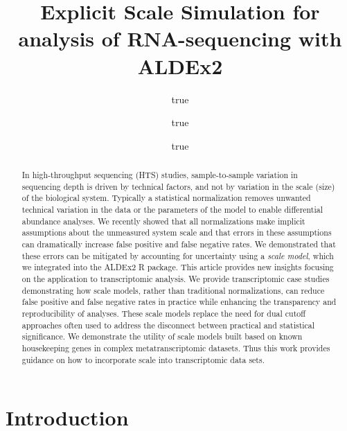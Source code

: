 \documentclass[
]{article}
\title{Explicit Scale Simulation for analysis of RNA-sequencing with
ALDEx2}
\author{true \and true \and true}
\date{}
\begin{document}
\maketitle
\begin{abstract}
In high-throughput sequencing (HTS) studies, sample-to-sample variation
in sequencing depth is driven by technical factors, and not by variation
in the scale (size) of the biological system. Typically a statistical
normalization removes unwanted technical variation in the data or the
parameters of the model to enable differential abundance analyses. We
recently showed that all normalizations make implicit assumptions about
the unmeasured system scale and that errors in these assumptions can
dramatically increase false positive and false negative rates. We
demonstrated that these errors can be mitigated by accounting for
uncertainty using a \emph{scale model}, which we integrated into the
ALDEx2 R package. This article provides new insights focusing on the
application to transcriptomic analysis. We provide transcriptomic case
studies demonstrating how scale models, rather than traditional
normalizations, can reduce false positive and false negative rates in
practice while enhancing the transparency and reproducibility of
analyses. These scale models replace the need for dual cutoff approaches
often used to address the disconnect between practical and statistical
significance. We demonstrate the utility of scale models built based on
known housekeeping genes in complex metatranscriptomic datasets. Thus
this work provides guidance on how to incorporate scale into
transcriptomic data sets.
\end{abstract}

\section{Introduction}\label{introduction}

\doublespacing 
\singlespacing
\end{document}
